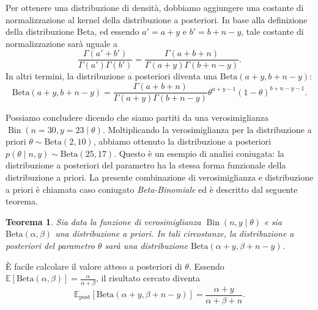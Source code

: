 \documentclass[
  10pt,
  italian,
  a4paper,
  extrafontsizes,onecolumn,openright
  ]{memoir}
\DeclareMathOperator{\Bin}{Bin} %
\newcommand{\E}{\mathbb{E}} %
\newtheorem{theorem}{Teorema}[chapter]
\theoremstyle{definition}
\theoremstyle{definition}
\theoremstyle{definition}
\theoremstyle{definition}
\theoremstyle{remark}
\begin{document}
Per ottenere una distribuzione di densità, dobbiamo aggiungere una costante di normalizzazione al kernel della distribuzione a posteriori. In base alla definizione della distribuzione Beta, ed essendo \(a' = a+y\) e \(b' = b+n-y\), tale costante di normalizzazione sarà uguale a
\[
\frac{\Gamma(a'+b')}{\Gamma(a')\Gamma(b')} = \frac{\Gamma(a+b+n)}{\Gamma(a+y)\Gamma(b+n-y)}.
\]
\noindent
In altri termini, la distribuzione a posteriori diventa una \(\mbox{Beta}(a+y, b+n-y)\):
\[
\mbox{Beta}(a+y, b+n-y) = \frac{\Gamma(a+b+n)}{\Gamma(a+y)\Gamma(b+n-y)} \theta^{a+y-1}(1-\theta)^{b+n-y-1}.
\]

Possiamo concludere dicendo che siamo partiti da una verosimiglianza \(\Bin(n = 30, y = 23 \mid \theta)\). Moltiplicando la verosimiglianza per la distribuzione a priori \(\theta \sim \mbox{Beta}(2, 10)\), abbiamo ottenuto la distribuzione a posteriori \(p(\theta \mid n, y) \sim \mbox{Beta}(25, 17)\). Questo è un esempio di analisi coniugata: la distribuzione a posteriori del parametro ha la stessa forma funzionale della distribuzione a priori. La presente combinazione di verosimiglianza e distribuzione a priori è chiamata caso coniugato \emph{Beta-Binomiale} ed è descritto dal seguente teorema.

\begin{theorem}
Sia data la funzione di verosimiglianza \(\Bin(n, y \mid \theta)\) e sia \(\mbox{Beta}(\alpha, \beta)\) una distribuzione a priori. In tali circostanze, la distribuzione a posteriori del parametro \(\theta\) sarà una distribuzione \(\mbox{Beta}(\alpha + y, \beta + n - y)\).
\end{theorem}

È facile calcolare il valore atteso a posteriori di \(\theta\). Essendo \(\E[\mbox{Beta}(\alpha, \beta)] = \frac{\alpha}{\alpha + \beta}\), il risultato cercato diventa
\begin{equation}
\E_{\text{post}} [\mathrm{Beta}(\alpha + y, \beta + n - y)] = \frac{\alpha + y}{\alpha + \beta +n}.
\label{eq:ev-post-beta-bin-1}
\end{equation}
\end{document}
